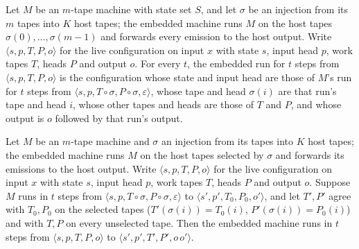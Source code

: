 \begin{theorem}
\label{Turing.NTimeDiag.qy_embed_gen}
\leanok
{}
Let $M$ be an $m$-tape machine with state set $S$, and let $\sigma$ be an injection from its $m$
tapes into $K$ host tapes; the embedded machine runs $M$ on the host tapes $\sigma(0), \dots,
\sigma(m - 1)$ and forwards every emission to the host output. Write
$\langle s, p, T, P, o\rangle$ for the live configuration on input $x$ with state $s$, input head
$p$, work tapes $T$, heads $P$ and output $o$. For every $t$, the embedded run for $t$ steps from
$\langle s, p, T, P, o\rangle$ is the configuration whose state and input head are those of
$M$'s run for $t$ steps from $\langle s, p, T \circ \sigma, P \circ \sigma, \varepsilon\rangle$,
whose tape and head $\sigma(i)$ are that run's tape and head $i$, whose other tapes and heads are
those of $T$ and $P$, and whose output is $o$ followed by that run's output.
\end{theorem}

\begin{theorem}
\label{Turing.NTimeDiag.qy_embed}
\leanok
{}
Let $M$ be an $m$-tape machine and $\sigma$ an injection from its tapes into $K$ host tapes; the
embedded machine runs $M$ on the host tapes selected by $\sigma$ and forwards its emissions to
the host output. Write $\langle s, p, T, P, o\rangle$ for the live configuration on input $x$ with
state $s$, input head $p$, work tapes $T$, heads $P$ and output $o$. Suppose $M$ runs in $t$ steps
from $\langle s, p, T \circ \sigma, P \circ \sigma, \varepsilon\rangle$ to
$\langle s', p', T_0, P_0, o'\rangle$, and let $T', P'$ agree with $T_0, P_0$ on the selected
tapes ($T'(\sigma(i)) = T_0(i)$, $P'(\sigma(i)) = P_0(i)$) and with $T, P$ on every unselected
tape. Then the embedded machine runs in $t$ steps from $\langle s, p, T, P, o\rangle$ to
$\langle s', p', T', P', o\, o'\rangle$.
\end{theorem}

